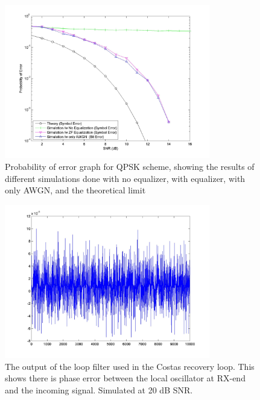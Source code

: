 \documentclass[]{article}
\begin{document}
\begin{figure}[H]
\centering
\includegraphics[width=0.8\textwidth]{qpSNR.jpg}
\caption{Probability of error graph for QPSK scheme, showing the results of different simulations done with no equalizer, with equalizer, with only AWGN, and the theoretical limit \label{fig:qpBER}}
\end{figure}

\begin{figure}[H]
\centering
\includegraphics[width=0.8\textwidth]{loop_filter_qpsk20.jpg}
\caption{The output of the loop filter used in the Costas recovery loop.  This shows there is phase error between the local oscillator at RX-end and the incoming signal. Simulated at 20 dB SNR. \label{fig:qpLoop}}
\end{figure}
\end{document}
